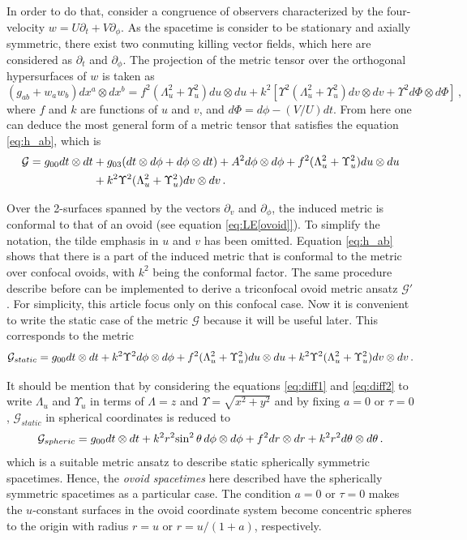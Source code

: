 \documentclass[12pt, ams, nofootinbib]{revtex4}
\def\be{\begin{equation}}
\def\ee{\end{equation}}
\def\X{\Lambda}
\def\Y{\Upsilon}
\newcommand{\sqb}[1]{\left[#1\right]}    %
\newcommand{\mb}[1]{\mathbf{#1}}         %
\newcommand{\mbi}[1]{\boldsymbol{#1}}    %
\theoremstyle{definition}
\begin{document}
In order to do that, consider a congruence of observers characterized by the four-velocity $w= U\partial_t + V \partial_\phi$. As the spacetime is consider to be stationary and axially symmetric, there exist two conmuting killing vector fields, which here are considered as $\partial_t$ and $\partial_\phi$. The projection of the metric tensor over the orthogonal hypersurfaces of $w$ is taken as
\be
	(g_{ab}+w_a w_b)dx^a \otimes dx^b = f^2(\X_u^2+\Y_u^2) du \otimes du + k^2\sqb{\Y^2(\X_u^2+\Y_u^2)dv\otimes dv + \Y^2 d\Phi\otimes d\Phi}\,,\label{eq:h_ab}
\ee
where $f$ and $k$ are functions of $u$ and $v$, and $d\Phi = d\phi-(V/U)dt$. From here one can deduce the most general form of a metric tensor that satisfies the equation \ref{eq:h_ab}, which is
\begin{align}
	\mathcal{G} = g_{00} dt\otimes dt &+ g_{03}(dt\otimes d\phi + d\phi \otimes dt) + A^2 d\phi \otimes d\phi + f^2(\X_u^2+\Y_u^2) du\otimes du\notag \\ 
	&+ k^2\Y^2(\X_u^2+\Y_u^2)dv\otimes dv\,.  \label{eq:G}
\end{align}

Over the 2-surfaces spanned by the vectors $\partial_v$ and $\partial_\phi$, the induced metric is conformal to that of an ovoid (see equation \ref{eq:LE[ovoid]}). To simplify the notation, the tilde emphasis in $u$ and $v$ has been omitted. Equation \ref{eq:h_ab} shows that there is a part of the induced metric that is conformal to the metric over confocal ovoids, with $k^2$ being the conformal factor. The same procedure describe before can be implemented to derive a triconfocal ovoid metric ansatz $\mathcal{G}'$. For simplicity, this article focus only on this confocal case. Now it is convenient to write the static case of the metric $\mathcal{G}$ because it will be useful later. This corresponds to the metric
\be
	\mathcal{G}_{static}= g_{00} dt\otimes dt + k^2\Y^2 d\phi \otimes d\phi + f^2(\X_u^2+\Y_u^2) du\otimes du\\ + k^2\Y^2(\X_u^2+\Y_u^2)dv\otimes dv\,. \label{eq:G_static}
\ee

It should be mention that by considering the equations \ref{eq:diff1} and \ref{eq:diff2} to write $\X_u$ and $\Y_u$ in terms of $\X=z$ and $\Y=\sqrt{x^2+y^2}$ and by fixing $a=0$ or $\tau=0$, $\mathcal{G}_{static}$ in spherical coordinates is reduced to
\be
\mathcal{G}_{spheric}= g_{00} dt\otimes dt + k^2r^2{\sin^2{\theta}}\, d\phi \otimes d\phi + f^2 dr\otimes dr\\ + k^2r^2 d\theta \otimes d\theta\,.
\ee
which is a suitable metric ansatz to describe static spherically symmetric spacetimes. Hence, the \textit{ovoid spacetimes} here described have the spherically symmetric spacetimes as a particular case. The condition $a=0$ or $\tau=0$ makes the $u$-constant surfaces in the ovoid coordinate system become concentric spheres to the origin with radius $r=u$ or $r=u/(1+a)$, respectively.
\end{document}
